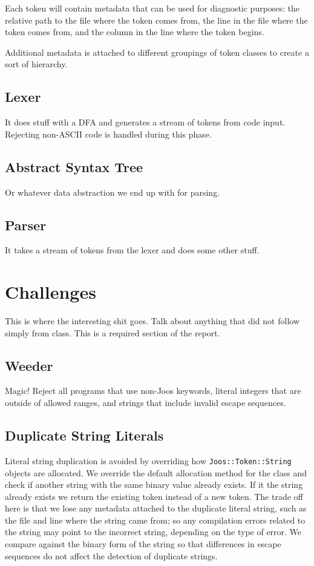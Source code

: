 \documentclass[pdftex,11pt,a4paper]{article}
\begin{document}
Each token will contain metadata that can be used for diagnostic
purposes: the relative path to the file where the token comes from,
the line in the file where the token comes from, and the column in the
line where the token begins.

Additional metadata is attached to different groupings of token
classes to create a sort of hierarchy.


\subsection{Lexer}

It does stuff with a DFA and generates a stream of tokens from code
input. Rejecting non-ASCII code is handled during this phase.


\subsection{Abstract Syntax Tree}

Or whatever data abstraction we end up with for parsing.


\subsection{Parser}

It takes a stream of tokens from the lexer and does some other stuff.


\section{Challenges}


This is where the interesting shit goes. Talk about anything that did
not follow simply from class. This is a required section of the report.


\subsection{Weeder}

Magic! Reject all programs that use non-Joos keywords, literal
integers that are outside of allowed ranges, and strings that include
invalid escape sequences.


\subsection{Duplicate String Literals}

Literal string duplication is avoided by overriding how
\texttt{Joos::Token::String} objects are allocated. We override the
default allocation method for the class and check if another string
with the same binary value already exists. If it the string already
exists we return the existing token instead of a new token. The trade
off here is that we lose any metadata attached to the duplicate
literal string, such as the file and line where the string came from;
so any compilation errors related to the string may point to the
incorrect string, depending on the type of error. We compare against
the binary form of the string so that differences in escape sequences
do not affect the detection of duplicate strings.
\end{document}
